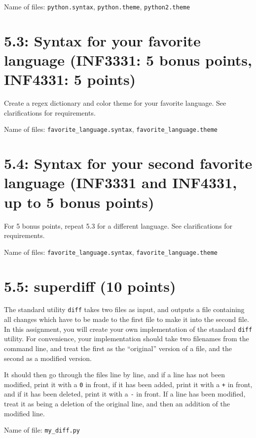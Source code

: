 \documentclass[english]{article}
\begin{document}
Name of files: \texttt{python.syntax}, \texttt{python.theme},  \texttt{python2.theme}

\section{5.3: Syntax for your favorite language (INF3331: 5 bonus points, INF4331: 5 points)}
Create a regex dictionary and color theme for your favorite language. See clarifications for requirements.

Name of files: \texttt{favorite\_language.syntax}, \texttt{favorite\_language.theme}

\section{5.4: Syntax for your second favorite language (INF3331 and INF4331, up to 5 bonus points)}
For 5 bonus points, repeat 5.3 for a different language. See clarifications for requirements.

Name of files: \texttt{favorite\_language.syntax}, \texttt{favorite\_language.theme}



\section{5.5: superdiff (10 points)}
The standard utility \texttt{diff} takes two files as input, and outputs a file containing all changes which have to be made to the first file to make it into the second file. In this assignment, you will create your own implementation of the standard \texttt{diff} utility. For convenience, your implementation should take two filenames from the command line, and treat the first as the ``original'' version of a file, and the second as a modified version.

It should then go through the files line by line, and if a line has not been modified, print it with a \texttt{0} in front, if it has been added, print it with a \texttt{+} in front, and if it has been deleted, print it with a \texttt{-} in front. If a line has been modified, treat it as being a deletion of the original line, and then an addition of the modified line.

Name of file: \texttt{my\_diff.py}
\end{document}

